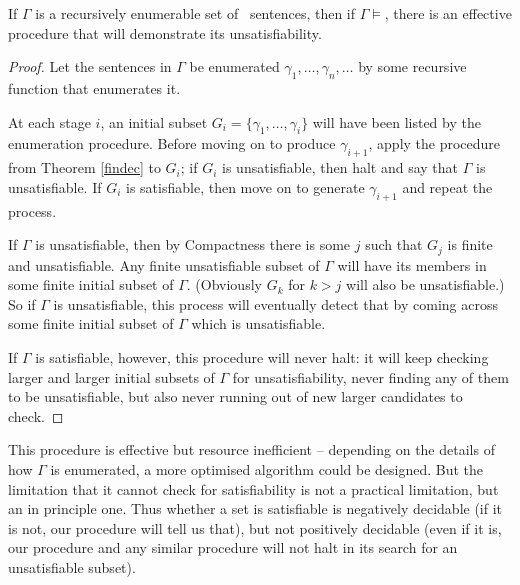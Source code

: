 \begin{theorem}\label{posdecinc}
If $\Gamma$ is a recursively enumerable set of \lone\ sentences, then if $\Gamma\vDash$, there is an effective procedure that will demonstrate its unsatisfiability.
\begin{proof}
	Let the sentences in $\Gamma$ be enumerated $\gamma_{1},…,\gamma_{n},…$ by some recursive function that enumerates it.

	At each stage $i$, an initial subset $G_{i} = \{\gamma_{1},…,\gamma_{i}\}$ will have been listed by the enumeration procedure. Before moving on to produce $\gamma_{i+1}$, apply the procedure from Theorem \ref{findec} to $G_{i}$; if $G_{i}$ is unsatisfiable, then halt and say that $\Gamma$ is unsatisfiable. If $G_{i}$ is satisfiable, then move on to generate $\gamma_{i+1}$ and repeat the process.

If $\Gamma$ is unsatisfiable, then by Compactness there is some $j$ such that $G_{j}$ is finite and unsatisfiable.  Any finite unsatisfiable subset of $\Gamma$ will have its members in some finite initial subset of $\Gamma$. (Obviously $G_{k}$ for $k>j$ will also be unsatisfiable.) So if $\Gamma$ is unsatisfiable, this process will eventually detect that by coming across some finite initial subset of $\Gamma$ which is unsatisfiable. 

If $\Gamma$ is satisfiable, however, this procedure will never halt: it will keep checking larger and larger initial subsets of $\Gamma$ for unsatisfiability, never finding any of them to be unsatisfiable, but also never running out of new larger candidates to check.
\end{proof}
\end{theorem}

This procedure is effective but resource inefficient – depending on the details of how $\Gamma$ is enumerated, a more optimised algorithm could be designed. But the limitation that it cannot check for satisfiability is not a practical limitation, but an in principle one. Thus whether a set is satisfiable is negatively decidable (if it is not, our procedure will tell us that), but not positively decidable (even if it is, our procedure and any similar procedure will not halt in its search for an unsatisfiable subset).






